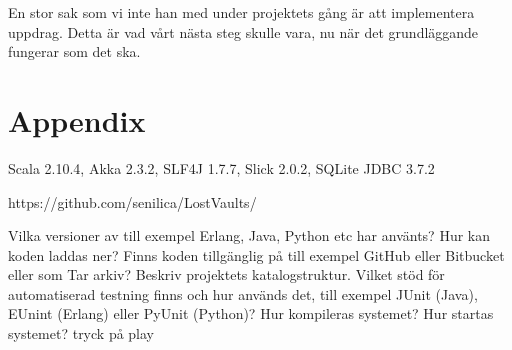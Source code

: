 \documentclass[a4paper]{article}
\begin{document}
En stor sak som vi inte han med under projektets gång är att implementera uppdrag. Detta är vad vårt nästa steg skulle vara, nu när det grundläggande fungerar som det ska. 

\section{Appendix}

Scala 2.10.4, Akka 2.3.2, SLF4J 1.7.7, Slick 2.0.2, SQLite JDBC 3.7.2

https://github.com/senilica/LostVaults/

Vilka versioner av till exempel Erlang, Java, Python etc har använts?
Hur kan koden laddas ner? Finns koden tillgänglig på till exempel GitHub eller Bitbucket eller som Tar arkiv?  Beskriv projektets katalogstruktur.
Vilket stöd för automatiserad testning finns och hur används det, till exempel JUnit (Java), EUnint (Erlang) eller PyUnit (Python)?
Hur kompileras systemet?
Hur startas systemet? tryck på play
\end{document}
